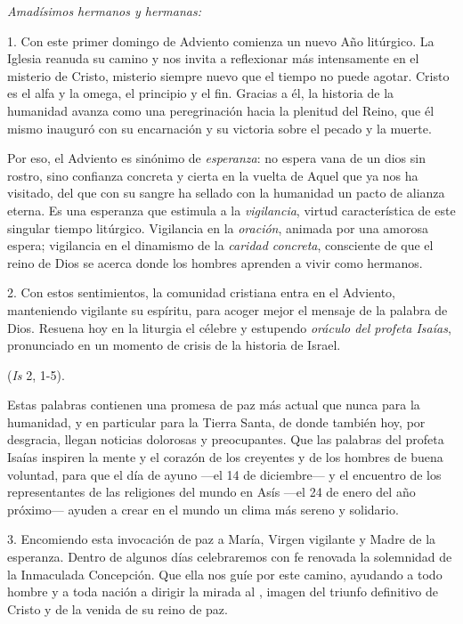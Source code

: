			\begin{body}
				\emph{Amadísimos hermanos y hermanas:} 
				
				1. Con este primer domingo de Adviento comienza un nuevo Año litúrgico. La Iglesia reanuda su camino y nos invita a reflexionar más intensamente en el misterio de Cristo, misterio siempre nuevo que el tiempo no puede agotar. Cristo es el alfa y la omega, el principio y el fin. Gracias a él, la historia de la humanidad avanza como una peregrinación hacia la plenitud del Reino, que él mismo inauguró con su encarnación y su victoria sobre el pecado y la muerte. 
				
				Por eso, el Adviento es sinónimo de \emph{esperanza}: no espera vana de un dios sin rostro, sino confianza concreta y cierta en la vuelta de Aquel que ya nos ha visitado, del  que con su sangre ha sellado con la humanidad un pacto de alianza eterna. Es una esperanza que estimula a la \emph{vigilancia}, virtud característica de este singular tiempo litúrgico. Vigilancia en la \emph{oración}, animada por una amorosa espera; vigilancia en el dinamismo de la \emph{caridad concreta}, consciente de que el reino de Dios se acerca donde los hombres aprenden a vivir como hermanos. 
				
				2. Con estos sentimientos, la comunidad cristiana entra en el Adviento, manteniendo vigilante su espíritu, para acoger mejor el mensaje de la palabra de Dios. Resuena hoy en la liturgia el célebre y estupendo \emph{oráculo del profeta Isaías}, pronunciado en un momento de crisis de la historia de Israel. 
				
				 (\emph{Is} 2, 1-5). 
				
				Estas palabras contienen una promesa de paz más actual que nunca para la humanidad, y en particular para la Tierra Santa, de donde también hoy, por desgracia, llegan noticias dolorosas y preocupantes. Que las palabras del profeta Isaías inspiren la mente y el corazón de los creyentes y de los hombres de buena voluntad, para que el día de ayuno ---el 14 de diciembre--- y el encuentro de los representantes de las religiones del mundo en Asís ---el 24 de enero del año próximo--- ayuden a crear en el mundo un clima más sereno y solidario. 
				
				3. Encomiendo esta invocación de paz a María, Virgen vigilante y Madre de la esperanza. Dentro de algunos días celebraremos con fe renovada la solemnidad de la Inmaculada Concepción. Que ella nos guíe por este camino, ayudando a todo hombre y a toda nación a dirigir la mirada al , imagen del triunfo definitivo de Cristo y de la venida de su reino de paz.
			\end{body}
	
